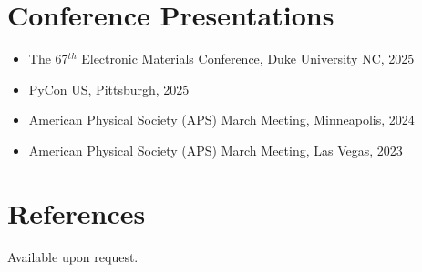 \documentclass[letter,11pt]{article}
\begin{document}
\section{Conference Presentations}
\begin{itemize}
    \item The 67$^{th}$ Electronic Materials Conference, Duke University NC, 2025
    \item PyCon US, Pittsburgh, 2025
    \item American Physical Society (APS) March Meeting, Minneapolis, 2024
    \item American Physical Society (APS) March Meeting, Las Vegas, 2023
\end{itemize}

\section{References}
Available upon request.
\end{document}
